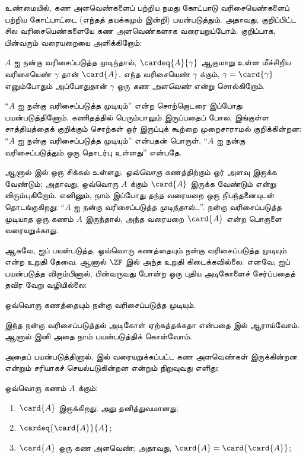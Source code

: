 \documentclass[../../../include/open-logic-section]{subfiles}
\begin{document}

உண்மையில், கண அளவெண்களைப் பற்றிய நமது கோட்பாடு வரிசையெண்களைப்
பற்றிய கோட்பாட்டை (எந்தத் தயக்கமும் இன்றி) பயன்படுத்தும். அதாவது,
குறிப்பிட்ட சில வரிசையெண்களையே கண அளவெண்களாக வரையறுப்போம்.
குறிப்பாக, பின்வரும் வரையறையை அளிக்கிறோம்:

\begin{defn}
$A$ ஐ நன்கு வரிசைப்படுத்த முடிந்தால், $\cardeq{A}{\gamma}$ ஆகுமாறு
உள்ள மீச்சிறிய வரிசையெண் $\gamma$ தான் $\card{A}$. எந்த வரிசையெண்
$\gamma$ க்கும், $\gamma = \card{\gamma}$ எனும்போதும் அப்போதுதான்
$\gamma$ ஒரு \emph{கண அளவெண்} என்று சொல்கிறோம்.
\end{defn}

``$A$ ஐ நன்கு வரிசைப்படுத்த முடியும்'' என்ற சொற்றொடரை இப்போது
பயன்படுத்தினோம். கணிதத்தில் பெரும்பாலும் இருப்பதைப் போல, இங்குள்ள
சாத்தியத்தைக் குறிக்கும் சொற்கள் ஓர் இருப்புக் கூற்றை முறைசாராமல்
குறிக்கின்றன: ``$A$ ஐ நன்கு வரிசைப்படுத்த முடியும்'' என்பதன் பொருள்,
``$A$ ஐ நன்கு வரிசைப்படுத்தும் ஒரு தொடர்பு உள்ளது'' என்பதே.

ஆனால்  இல் ஒரு சிக்கல் உள்ளது.
\emph{ஒவ்வொரு} கணத்திற்கும் ஓர் அளவு இருக்க வேண்டும்; அதாவது,
ஒவ்வொரு $A$ க்கும் $\card{A}$ இருக்க வேண்டும் என்று விரும்புகிறோம்.
எனினும், நாம் இப்போது தந்த வரையறை ஒரு நிபந்தனையுடன் தொடங்குகிறது:
``$A$ ஐ நன்கு வரிசைப்படுத்த \emph{முடிந்தால்}\ldots''.
நன்கு வரிசைப்படுத்த முடியாத ஒரு கணம் $A$ இருந்தால், அந்த வரையறை
$\card{A}$ என்ற பொருளை வரையறுக்காது.

ஆகவே,  ஐப் பயன்படுத்த, ஒவ்வொரு கணத்தையும்
நன்கு வரிசைப்படுத்த முடியும் என்ற உறுதி தேவை. ஆனால் $\ZF$ இல்
அந்த உறுதி கிடைக்கவில்லை. எனவே,  ஐப்
பயன்படுத்த விரும்பினால், பின்வருவது போன்ற ஒரு புதிய அடிகோளைச்
சேர்ப்பதைத் தவிர வேறு வழியில்லை:
\begin{axiom}[நன்கு வரிசைப்படுத்தல்]
ஒவ்வொரு கணத்தையும் நன்கு வரிசைப்படுத்த முடியும்.
\end{axiom}
இந்த நன்கு வரிசைப்படுத்தல் அடிகோள் ஏற்கத்தக்கதா என்பதை
 இல் ஆராய்வோம். ஆனால் இனி அதை நாம்
பயன்படுத்திக் கொள்வோம்.

அதைப் பயன்படுத்தினால்,  இல் வரையறுக்கப்பட்ட
கண அளவெண்கள் இருக்கின்றன என்றும் சரியாகச் செயல்படுகின்றன என்றும்
நிறுவுவது எளிது:

\begin{lem}
ஒவ்வொரு கணம் $A$ க்கும்:
\begin{enumerate}
	\item{} $\card{A}$ இருக்கிறது; அது தனித்துவமானது;
	\item{}  $\cardeq{\card{A}}{A}$;
	\item{}  $\card{A}$ ஒரு கண அளவெண்; அதாவது,
	$\card{A} = \card{\card{A}}$;
\end{enumerate}
\end{lem}
\end{document}
